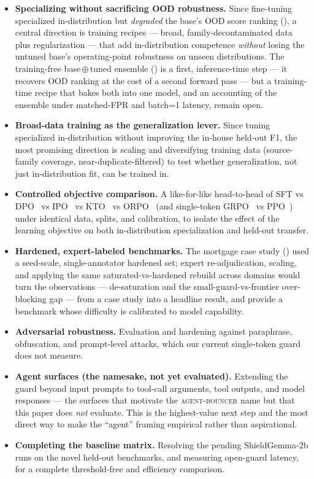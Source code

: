 \documentclass[sigconf,nonacm]{acmart}
\begin{document}
\begin{itemize}
  \item \textbf{Specializing without sacrificing OOD robustness.} Since fine-tuning specialized in-distribution but \emph{degraded} the base's OOD score ranking (), a central direction is training recipes --- broad, family-decontaminated data plus regularization --- that add in-distribution competence \emph{without} losing the untuned base's operating-point robustness on unseen distributions. The training-free base\,$\oplus$\,tuned ensemble () is a first, inference-time step --- it recovers OOD ranking at the cost of a second forward pass --- but a training-time recipe that bakes both into one model, and an accounting of the ensemble under matched-FPR and batch=1 latency, remain open.
  \item \textbf{Broad-data training as the generalization lever.} Since tuning specialized in-distribution without improving the in-house held-out F1, the most promising direction is scaling and diversifying training data (source-family coverage, near-duplicate-filtered) to test whether generalization, not just in-distribution fit, can be trained in.
  \item \textbf{Controlled objective comparison.} A like-for-like head-to-head of SFT vs DPO~\cite{rafailov2023dpo} vs IPO~\cite{azar2023ipo} vs KTO~\cite{ethayarajh2024kto} vs ORPO~\cite{hong2024orpo} (and single-token GRPO~\cite{shao2024deepseekmath} vs PPO~\cite{schulman2017ppo}) under identical data, splits, and calibration, to isolate the effect of the learning objective on both in-distribution specialization and held-out transfer.
  \item \textbf{Hardened, expert-labeled benchmarks.} The mortgage case study () used a seed-scale, single-annotator hardened set; expert re-adjudication, scaling, and applying the same saturated-vs-hardened rebuild across domains would turn the observations --- de-saturation and the small-guard-vs-frontier over-blocking gap --- from a case study into a headline result, and provide a benchmark whose difficulty is calibrated to model capability.
  \item \textbf{Adversarial robustness.} Evaluation and hardening against paraphrase, obfuscation, and prompt-level attacks, which our current single-token guard does not measure.
  \item \textbf{Agent surfaces (the namesake, not yet evaluated).} Extending the guard beyond input prompts to tool-call arguments, tool outputs, and model responses --- the surfaces that motivate the \textsc{agent-bouncer} name but that this paper does \emph{not} evaluate. This is the highest-value next step and the most direct way to make the ``agent'' framing empirical rather than aspirational.
  \item \textbf{Completing the baseline matrix.} Resolving the pending ShieldGemma-2b runs on the novel held-out benchmarks, and measuring open-guard latency, for a complete threshold-free and efficiency comparison.
\end{itemize}
\end{document}
